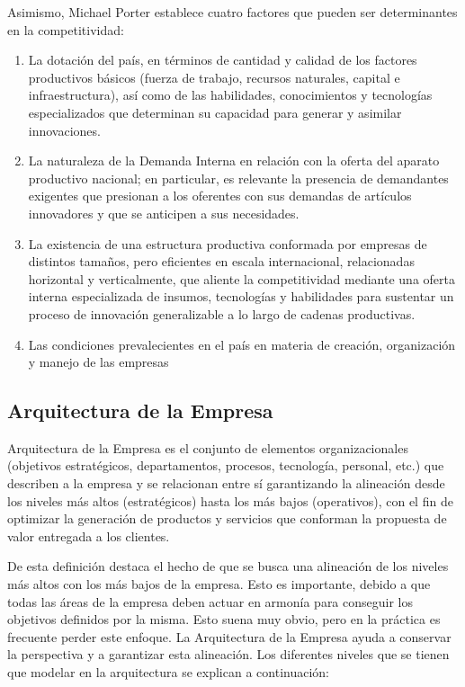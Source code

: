 Asimismo, Michael Porter establece cuatro factores que pueden ser determinantes en la competitividad:
\begin{enumerate}
	\item La dotación del país, en términos de cantidad y calidad de los factores productivos básicos (fuerza de trabajo,
		recursos naturales, capital e infraestructura), así como de las habilidades, conocimientos y tecnologías
		 especializados que determinan su capacidad para generar y asimilar innovaciones.
	\item La naturaleza de la Demanda Interna en relación con la oferta del aparato productivo nacional; en particular,
		es relevante la presencia de demandantes exigentes que presionan a los oferentes con sus demandas de artículos
		innovadores y que se anticipen a sus necesidades.
	\item La existencia de una estructura productiva conformada por empresas de distintos tamaños, pero eficientes en escala
		internacional, relacionadas horizontal y verticalmente, que aliente la competitividad mediante una oferta interna
		especializada de insumos, tecnologías y habilidades para sustentar un proceso de innovación generalizable a lo
		largo de cadenas productivas.
	\item Las condiciones prevalecientes en el país en materia de creación, organización y manejo de las empresas
\end{enumerate}

\subsection*{Arquitectura de la Empresa}

Arquitectura de la Empresa es el conjunto de elementos organizacionales (objetivos estratégicos, departamentos, procesos, tecnología,
personal, etc.) que describen a la empresa y se relacionan entre sí garantizando la alineación desde los niveles más altos (estratégicos)
hasta los más bajos (operativos), con el fin de optimizar la generación de productos y servicios que conforman la propuesta de valor
entregada a los clientes.

De esta definición destaca el hecho de que se busca una alineación de los niveles más altos con los más bajos de la empresa. Esto es
importante, debido a que todas las áreas de la empresa deben actuar en armonía para conseguir los objetivos definidos por la misma.
Esto suena muy obvio, pero en la práctica es frecuente perder este enfoque. La Arquitectura de la Empresa ayuda a conservar la
perspectiva y a garantizar esta alineación. Los diferentes niveles que se tienen que modelar en la arquitectura se explican a continuación:

